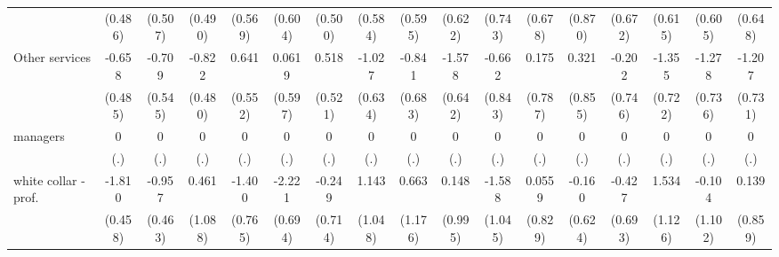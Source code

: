 {\begin{tabular}{l*{16}{c}}
                    &     (0.486)         &     (0.507)         &     (0.490)         &     (0.569)         &     (0.604)         &     (0.500)         &     (0.584)         &     (0.595)         &     (0.622)         &     (0.743)         &     (0.678)         &     (0.870)         &     (0.672)         &     (0.615)         &     (0.605)         &     (0.648)         \\
[1em]
Other services      &      -0.658         &      -0.709         &      -0.822         &       0.641         &      0.0619         &       0.518         &      -1.027         &      -0.841         &      -1.578\sym{*}  &      -0.662         &       0.175         &       0.321         &      -0.202         &      -1.355         &      -1.278         &      -1.207         \\
                    &     (0.485)         &     (0.545)         &     (0.480)         &     (0.552)         &     (0.597)         &     (0.521)         &     (0.634)         &     (0.683)         &     (0.642)         &     (0.843)         &     (0.787)         &     (0.855)         &     (0.746)         &     (0.722)         &     (0.736)         &     (0.731)         \\
[1em]
managers            &           0         &           0         &           0         &           0         &           0         &           0         &           0         &           0         &           0         &           0         &           0         &           0         &           0         &           0         &           0         &           0         \\
                    &         (.)         &         (.)         &         (.)         &         (.)         &         (.)         &         (.)         &         (.)         &         (.)         &         (.)         &         (.)         &         (.)         &         (.)         &         (.)         &         (.)         &         (.)         &         (.)         \\
[1em]
white collar - prof.&      -1.810\sym{***}&      -0.957\sym{*}  &       0.461         &      -1.400         &      -2.221\sym{**} &      -0.249         &       1.143         &       0.663         &       0.148         &      -1.588         &      0.0559         &      -0.160         &      -0.427         &       1.534         &      -0.104         &       0.139         \\
                    &     (0.458)         &     (0.463)         &     (1.088)         &     (0.765)         &     (0.694)         &     (0.714)         &     (1.048)         &     (1.176)         &     (0.995)         &     (1.045)         &     (0.829)         &     (0.624)         &     (0.693)         &     (1.126)         &     (1.102)         &     (0.859)         \\

\end{tabular}}
